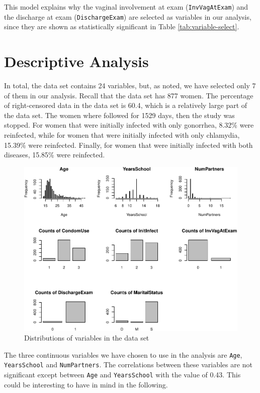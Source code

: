 \documentclass[
]{article}
\begin{document}
This model explains why the vaginal involvement at exam (\texttt{InvVagAtExam}) and the discharge at exam (\texttt{DischargeExam}) are selected as variables in our analysis, since they are shown as statistically significant in Table \ref{tab:variable-select}.

\hypertarget{descriptive-analysis}{%
\section{Descriptive Analysis}\label{descriptive-analysis}}

In total, the data set contains 24 variables, but, as noted, we have selected only 7 of them in our analysis. Recall that the data set has 877 women. The percentage of right-censored data in the data set is 60.4, which is a relatively large part of the data set. The women where followed for 1529 days, then the study was stopped. For women that were initially infected with only gonorrhea, 8.32\% were reinfected, while for women that were initially infected with only chlamydia, 15.39\% were reinfected. Finally, for women that were initially infected with both diseases, 15.85\% were reinfected.

\begin{figure}
\centering
\includegraphics{practical_files/figure-latex/EDA-plots-1.pdf}
\caption{\label{fig:EDA-plots}Distributions of variables in the data set}
\end{figure}

The three continuous variables we have chosen to use in the analysis are \texttt{Age}, \texttt{YearsSchool} and \texttt{NumPartners}. The correlations between these variables are not significant except between \texttt{Age} and \texttt{YearsSchool} with the value of 0.43. This could be interesting to have in mind in the following.
\end{document}

